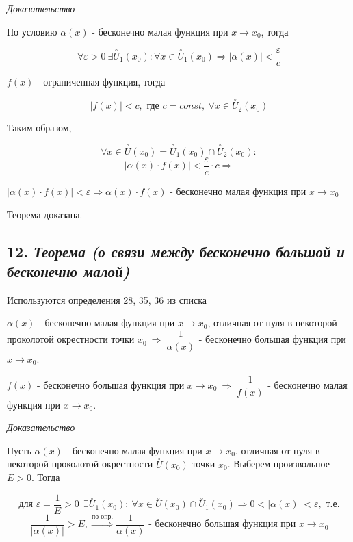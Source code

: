 \textit{Доказательство}

По условию $\alpha(x)$ - бесконечно малая функция при $x \rightarrow x_0$, тогда

$$
\forall {\varepsilon} > 0 \ \exists\overset{\circ}U_1(x_0): 
\forall x \in \overset{\circ}U_1(x_0) \Rightarrow |\alpha(x)| < \dfrac{ {\varepsilon}}{c}
$$

$f(x)$ - ограниченная функция, тогда

$$
|f(x)| < c, \text{ где } c = const, \ \forall x \in \overset{\circ}U_2(x_0)
$$

Таким образом,

$$
\forall x \in \overset{\circ}U(x_0) = \overset{\circ}U_1(x_0) \cap \overset{\circ}U_2(x_0):
$$ $$
|\alpha(x)\cdot f(x)| < \dfrac{ {\varepsilon}}{c} \cdot c \Rightarrow
$$

$ \mid \alpha(x)\cdot f(x)\mid  < {\varepsilon} \Rightarrow \alpha(x)\cdot f(x)$ - бесконечно малая функция при $x \rightarrow x_0$

Теорема доказана.
\newpage 
\subsection*{12. \textit{Теорема (о связи между бесконечно большой и бесконечно малой)}}
\begin{Quote2} 
\small\centering 

Используются определения 28, 35, 36 из списка \end{Quote2} 

$\alpha(x)$ - бесконечно малая функция при $x \rightarrow x_0$, отличная от нуля в некоторой проколотой окрестности точки $x_0 \ \Rightarrow \ {\dfrac{1}{\alpha(x)}}$ - бесконечно большая функция при $x \rightarrow x_0$.

$f(x)$ - бесконечно большая функция при $x \rightarrow x_0 \ \Rightarrow \ {\dfrac{1}{f(x)}}$ - бесконечно малая функция при $x \rightarrow x_0$.
\vspace*{20pt} 

\textit{Доказательство}

Пусть $\alpha(x)$ - бесконечно малая функция при $x \rightarrow x_0$, отличная от нуля в некоторой проколотой окрестности $\overset{\circ}U(x_0)$ точки $x_0$. Выберем произвольное $E > 0$. Тогда

$$
\text{для } {\varepsilon} = \dfrac{1}{E} > 0 \ \ \exists \overset{\circ}U_1(x_0): \ \forall x \in \overset{\circ}U(x_0) \cap \overset{\circ}U_1(x_0) \Rightarrow 0 < |\alpha(x)| < {\varepsilon}, \text{ т.е.}
$$ $$
\dfrac{1}{|\alpha(x)|} > E, \overset{\text{по опр.}}\Rightarrow \dfrac{1}{\alpha(x)} \text{ - бесконечно большая функция при } x \rightarrow x_0 
$$


